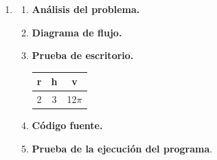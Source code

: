 \begin{enumerate}
\begin{enumerate}[\bfseries a)]
\begin{center}
	\end{center}

\end{enumerate}

\newpage

\item 

\begin{enumerate}[\bfseries a)]
    
    \item \textbf{Análisis del problema.}\\


    \item \textbf{Diagrama de flujo.}\\
	\begin{center}
	\end{center}

    \item \textbf{Prueba de escritorio.}\\
	\begin{center}
	    \begin{tabular}{c|c|c}
		r&h&v\\
		\hline
		2&3&12$\pi$\\
	    \end{tabular}
	\end{center}
	\vspace{1cm}
    
    \item \textbf{Código fuente.}\\ 
	
	\vspace{1cm}
    
    \item \textbf{Prueba de la ejecución del programa}.\\
	\begin{center}
	\end{center}

\end{enumerate}

\newpage

\end{enumerate}
